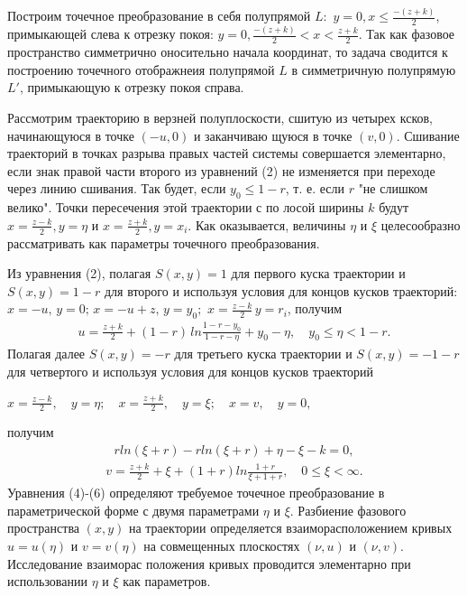 \documentclass{article}
\begin{document}
Построим точечное преобразование в себя полупрямой $L:$
$y=0, x\leq\frac{-(z+k)}{2}$, примыкающей слева к отрезку покоя: $y
=0, \frac{-(z+k)}{2}<x<\frac{z+k}{2}$. Так как фазовое пространство
симметрично оносительно начала координат, то задача сводится
к построению точечного отображнеия полупрямой $L$ в симметричную 
полупрямую $L'$, примыкающую к отрезку покоя справа.%

Рассмотрим траекторию в верзней полуплоскости, сшитую из
четырех ксков, начинающуюся в точке $(-u, 0)$ и заканчиваю
щуюся в точке $(v,0)$. \flqq Сшивание \frqq траекторий в точках разрыва 
правых частей системы совершается элементарно, если знак
правой части второго из уравнений (2) не изменяется при переходе 
через линию сшивания. Так будет, если $y_{0}\leq1-r$, т. е. если
$r$ "не слишком велико". Точки пересечения этой траектории с по
лосой ширины $k$ будут $x=\frac{z-k}{2}, y=\eta$ и $x=\frac{z+k}{2}, y=x_{i}$. Как
оказывается, величины $\eta$ и $\xi$ целесообразно рассматривать как
параметры точечного преобразования.%

Из уравнения (2), полагая $S(x, y)=1$ для первого куска
траектории и $S(x, y)=1-r$ для второго и используя условия
для концов кусков траекторий: $x=-u, \, y=0; \, x=-u+z, \, y=y_{0};$
$x=\frac{z-k}{2} \, y=r_{i}$, получим
\begin{gather}
u=\frac{z+k}{2} + (1-r) \, ln\frac{1-r-y_{0}}{1-r-\eta}+y_{0}-\eta, \quad  y_{0}\leq\eta<1-r.
\end{gather}
Полагая далее $S(x,y)=-r$ для третьего куска траектории и
$S(x,y)=-1-r$ для четвертого и используя условия для концов
кусков траекторий
\begin{center}
$x=\frac{z-k}{2}, \quad y=\eta; \quad x=\frac{z+k}{2}, \quad y=\xi; \quad x=v,  \quad y=0,$
\end{center}
получим
\begin{gather}
r ln(\xi + r) - r ln(\xi+r)+\eta-\xi-k=0,
\end{gather}
\begin{gather}
v=\frac{z+k}{2}+\xi+(1+r)ln\frac{1+r}{\xi+1+r}, \quad 0\leq\xi<\infty. 
\end{gather}
Уравнения (4)-(6) определяют требуемое точечное преобразование 
в параметрической форме с двумя параметрами $\eta$ и $\xi$.
Разбиение фазового пространства $(x,y)$ на траектории определяется 
взаиморасположением кривых $u=u(\eta)$ и $v=v(\eta)$ на совмещенных 
плоскостях $(\nu, u)$ и $(\nu, v)$. Исследование взаиморас
положения кривых проводится элементарно при использовании
$\eta$ и $\xi$ как параметров.%
\end{document}

